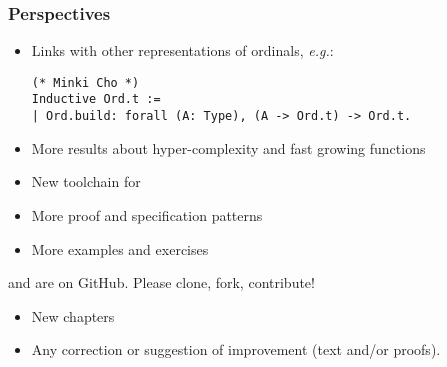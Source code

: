 \documentclass[10pt, fleqn]{beamer}
\begin{document}

\begin{frame}[fragile]
  \frametitle{Perspectives}
  \begin{block}{}
    \begin{itemize}

    \item  Links with other representations of ordinals, \emph{e.g.}:
  \begin{footnotesize}
    {\color{blue}
\begin{verbatim}
(* Minki Cho *)
Inductive Ord.t :=
| Ord.build: forall (A: Type), (A -> Ord.t) -> Ord.t.
\end{verbatim}
      }
 \end{footnotesize}
      
      \item More results about hyper-complexity and fast growing functions
    \item New toolchain for \alectr
    \item More proof and specification patterns
    \item More examples and exercises
     \end{itemize}
  \end{block}

  \begin{block}{}
  {\color{plugincolor}\Hydras} and  {\color{plugincolor}\community} are on GitHub. {\color{cyan}Please clone, fork, contribute!}
      \begin{itemize}
      \item New chapters
      \item Any correction or suggestion of improvement (text and/or proofs).
        
  
    \end{itemize}
     \end{block}
 
  
\end{frame}
\end{document}
